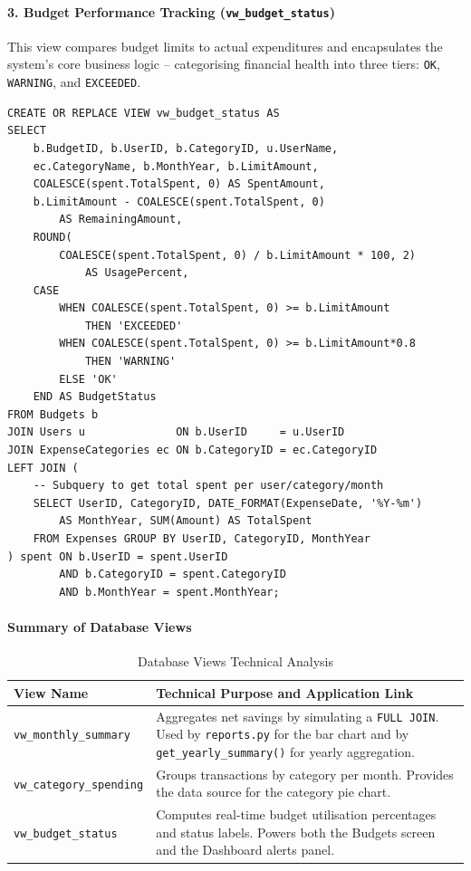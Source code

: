 \documentclass[12pt, a4paper]{article}
\begin{document}
\paragraph{3. Budget Performance Tracking (\texttt{vw\_budget\_status})}

This view compares budget limits to actual expenditures and encapsulates the system's
core business logic -- categorising financial health into three tiers:
\texttt{OK}, \texttt{WARNING}, and \texttt{EXCEEDED}.

\begin{lstlisting}[style=sqlstyle, caption={vw\_budget\_status View (excerpt)}]
CREATE OR REPLACE VIEW vw_budget_status AS
SELECT
    b.BudgetID, b.UserID, b.CategoryID, u.UserName,
    ec.CategoryName, b.MonthYear, b.LimitAmount,
    COALESCE(spent.TotalSpent, 0) AS SpentAmount,
    b.LimitAmount - COALESCE(spent.TotalSpent, 0) 
        AS RemainingAmount,
    ROUND(
        COALESCE(spent.TotalSpent, 0) / b.LimitAmount * 100, 2)
            AS UsagePercent,
    CASE
        WHEN COALESCE(spent.TotalSpent, 0) >= b.LimitAmount 
            THEN 'EXCEEDED'
        WHEN COALESCE(spent.TotalSpent, 0) >= b.LimitAmount*0.8 
            THEN 'WARNING'
        ELSE 'OK'
    END AS BudgetStatus
FROM Budgets b
JOIN Users u              ON b.UserID     = u.UserID
JOIN ExpenseCategories ec ON b.CategoryID = ec.CategoryID
LEFT JOIN (
    -- Subquery to get total spent per user/category/month
    SELECT UserID, CategoryID, DATE_FORMAT(ExpenseDate, '%Y-%m') 
        AS MonthYear, SUM(Amount) AS TotalSpent
    FROM Expenses GROUP BY UserID, CategoryID, MonthYear
) spent ON b.UserID = spent.UserID 
        AND b.CategoryID = spent.CategoryID 
        AND b.MonthYear = spent.MonthYear;
\end{lstlisting}

\paragraph{Summary of Database Views}

\begin{table}[H]
\centering
\caption{Database Views Technical Analysis}
\label{tab:database_views}
\begin{tabularx}{\textwidth}{lX}
\toprule
\textbf{View Name} & \textbf{Technical Purpose and Application Link} \\
\midrule
\texttt{vw\_monthly\_summary}   & Aggregates net savings by simulating a \texttt{FULL JOIN}.
                                  Used by \texttt{reports.py} for the bar chart and by
                                  \texttt{get\_yearly\_summary()} for yearly aggregation. \\
\texttt{vw\_category\_spending} & Groups transactions by category per month.
                                  Provides the data source for the category pie chart. \\
\texttt{vw\_budget\_status}     & Computes real-time budget utilisation percentages and
                                  status labels. Powers both the Budgets screen and the
                                  Dashboard alerts panel. \\
\bottomrule
\end{tabularx}
\end{table}
\end{document}
